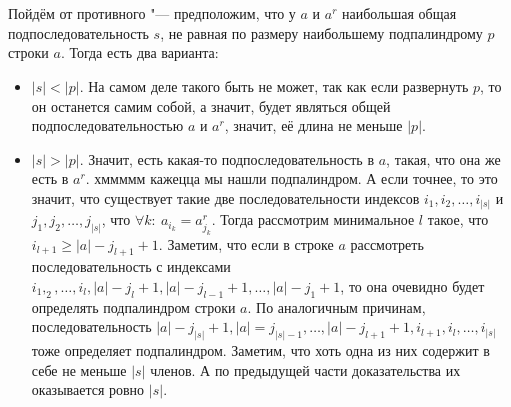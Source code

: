 \section{}
	Пойдём от противного "--- предположим, что у $a$ и $a^r$ наибольшая общая подпоследовательность $s$, не равная по размеру наибольшему подпалиндрому $p$ строки $a$. Тогда есть два варианта:
	\begin{itemize}
		\item $|s| < |p|$. На самом деле такого быть не может, так как если развернуть $p$, то он останется самим собой, а значит, будет являться общей подпоследовательностью $a$ и $a^r$, значит, её длина не меньше $|p|$.
		\item $|s| > |p|$. Значит, есть какая-то подпоследовательность в $a$, такая, что она же есть в $a^r$. хммммм кажецца мы нашли подпалиндром. А если точнее, то это значит, что существует такие две последовательности индексов $i_1, i_2, \dotsc, i_|s|$ и $j_1, j_2, \dotsc, j_|s|$, что $\forall k:\:a_{i_k} = a^r_{j_k}$. Тогда рассмотрим минимальное $l$ такое, что $i_{l + 1} \geq |a| - j_{l + 1} + 1$. Заметим, что если в строке $a$ рассмотреть последовательность с индексами $i_1, _2, \dotsc, i_l, |a| - j_l + 1, |a| - j_{l-1} + 1, \dotsc, |a| - j_1 + 1$, то она очевидно будет определять подпалиндром строки $a$. По аналогичным причинам, последовательность $|a| - j_|s| + 1, |a| = j_{|s| - 1}, \dotsc, |a| - j_{l + 1} + 1, i_{l + 1}, i_l, \dotsc, i_{|s|}$ тоже определяет подпалиндром. Заметим, что хоть одна из них содержит в себе не меньше $|s|$ членов. А по предыдущей части доказательства их оказывается ровно $|s|$. 
	\end{itemize}